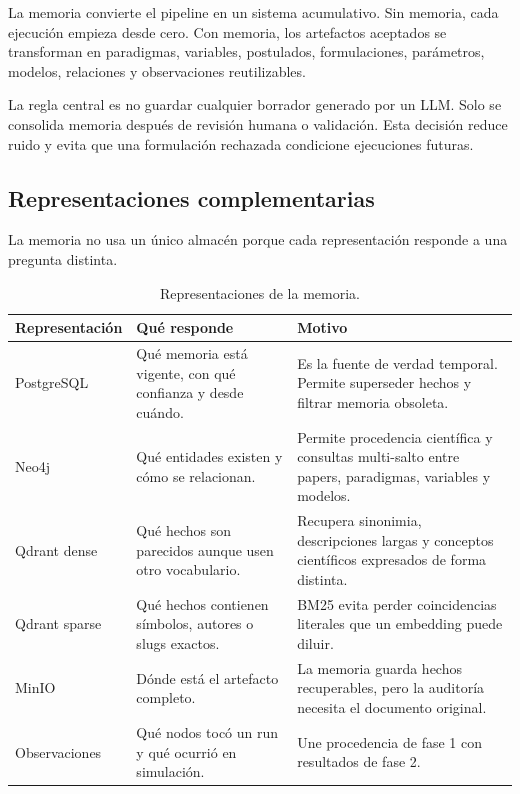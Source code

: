 La memoria convierte el pipeline en un sistema acumulativo. Sin memoria, cada
ejecución empieza desde cero. Con memoria, los artefactos aceptados se
transforman en paradigmas, variables, postulados, formulaciones, parámetros,
modelos, relaciones y observaciones reutilizables.

La regla central es no guardar cualquier borrador generado por un LLM. Solo se
consolida memoria después de revisión humana o validación. Esta decisión reduce
ruido y evita que una formulación rechazada condicione ejecuciones futuras.

\subsection{Representaciones complementarias}

La memoria no usa un único almacén porque cada representación responde a una
pregunta distinta.

\begin{table}[H]
\begin{center}
\small
\begin{tabular}{|p{3cm}|p{4.2cm}|p{5.2cm}|} \hline
\textbf{Representación} & \textbf{Qué responde} & \textbf{Motivo} \\ \hline
PostgreSQL & Qué memoria está vigente, con qué confianza y desde cuándo. & Es la fuente de verdad temporal. Permite superseder hechos y filtrar memoria obsoleta. \\ \hline
Neo4j & Qué entidades existen y cómo se relacionan. & Permite procedencia científica y consultas multi-salto entre papers, paradigmas, variables y modelos. \\ \hline
Qdrant dense & Qué hechos son parecidos aunque usen otro vocabulario. & Recupera sinonimia, descripciones largas y conceptos científicos expresados de forma distinta. \\ \hline
Qdrant sparse & Qué hechos contienen símbolos, autores o slugs exactos. & BM25 evita perder coincidencias literales que un embedding puede diluir. \\ \hline
MinIO & Dónde está el artefacto completo. & La memoria guarda hechos recuperables, pero la auditoría necesita el documento original. \\ \hline
Observaciones & Qué nodos tocó un run y qué ocurrió en simulación. & Une procedencia de fase 1 con resultados de fase 2. \\ \hline
\end{tabular}
\caption{Representaciones de la memoria.}
\end{center}
\end{table}

